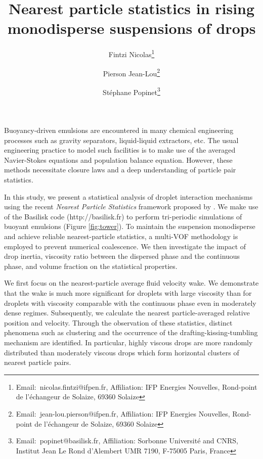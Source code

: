 \documentclass{icnmmf5}
\title{Nearest particle statistics in rising monodisperse suspensions of drops}
\author{Fintzi Nicolas\thanks{Email:~nicolas.fintzi@ifpen.fr, Affiliation: IFP Energies Nouvelles, Rond-point de l'échangeur de Solaize, 69360 Solaize
} \and %
Pierson Jean-Lou\thanks{Email:~jean-lou.pierson@ifpen.fr, Affiliation: IFP Energies Nouvelles, Rond-point de l'échangeur de Solaize, 69360 Solaize
}%
\and
St\'ephane Popinet\thanks{Email:~popinet@basilisk.fr, Affiliation: Sorbonne Université and CNRS, Institut Jean Le Rond d'Alembert UMR 7190, F-75005 Paris, France} }
\date{}
\begin{document}
\maketitle

Buoyancy-driven emulsions are encountered in many chemical engineering processes such as gravity separators, liquid-liquid extractors, etc. The usual engineering practice to model such facilities is to make use of the averaged Navier-Stokes equations and population balance equation. However, these methods necessitate closure laws and a deep understanding of particle pair statistics. %

In this study, we present a statistical analysis of droplet interaction mechanisms using the recent \textit{Nearest Particle Statistics} framework proposed by \cite{zhang2021ensemble}. We make use of the Basilisk code (http://basilisk.fr) to perform tri-periodic simulations of buoyant emulsions (Figure \ref{fig:tower}). To maintain the suspension monodisperse and achieve reliable nearest-particle statistics, a multi-VOF methodology is employed to prevent numerical coalescence. We then investigate the impact of drop inertia, viscosity ratio between the dispersed phase and the continuous phase, and volume fraction on the statistical properties. 

We first focus on the nearest-particle average fluid velocity wake. We demonstrate that the wake is much more significant for droplets with large viscosity than for droplets with viscosity comparable with the continuous phase even in moderately dense regimes. Subsequently, we calculate the nearest particle-averaged relative position and velocity. Through the observation of these statistics, distinct phenomena such as clustering and the occurrence of the drafting-kissing-tumbling mechanism are identified. In particular, highly viscous drops are more randomly distributed than moderately viscous drops which form horizontal clusters of nearest particle pairs.


\end{document}
